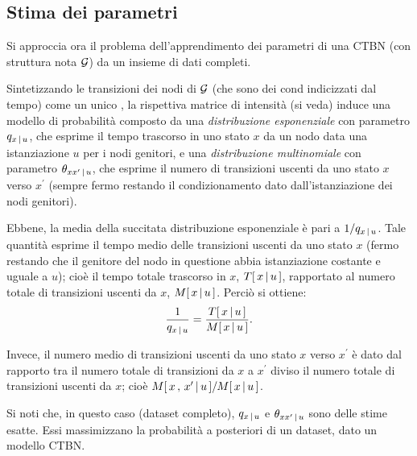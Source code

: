 \subsection{Stima dei parametri}
\label{sec:ctbn-params}
Si approccia ora il problema dell'apprendimento dei parametri di una \acl{CTBN} (con struttura nota $\mathcal{G}$) da un insieme di dati completi.

Sintetizzando le transizioni dei nodi di $\mathcal{G}$ (che sono dei \mprocess{}cond{} indicizzati dal tempo) come un unico \mprocess{} \omog{}, la rispettiva matrice di intensità (si veda) induce una modello di probabilità composto da una \emph{distribuzione esponenziale} con parametro $q_{x\,\arrowvert\,u}$, che esprime il tempo trascorso in uno stato $x$ da un nodo data una istanziazione $u$ per i nodi genitori, e una \emph{distribuzione multinomiale} con parametro $\theta_{xx^\prime\,\arrowvert\,u}$, che esprime il numero di transizioni uscenti da uno stato $x$ verso $x^\prime$ (sempre fermo restando il condizionamento dato dall'istanziazione dei nodi genitori).

Ebbene, la media della succitata distribuzione esponenziale è pari a $1/q_{x\,\arrowvert\,u}$. Tale quantità esprime il tempo medio delle transizioni uscenti da uno stato $x$ (fermo restando che il genitore del nodo in questione abbia istanziazione costante e uguale a $u$); cioè il tempo totale trascorso in $x$, $T[\,x\,\arrowvert\,u\,]$, rapportato al numero totale di transizioni uscenti da $x$, $\mstat{x\,\arrowvert\,u}$. Perciò si ottiene:
\[
\frac{1}{q_{x\,\arrowvert\,u}}=\frac{\tstat{x\,\arrowvert\,u}}{\mstat{x\,\arrowvert\,u}}\text{.}
\]

Invece, il numero medio di transizioni uscenti da uno stato $x$ verso $x^\prime$ è dato dal rapporto tra il numero totale di transizioni da $x$ a $x^\prime$ diviso il numero totale di transizioni uscenti da $x$; cioè $\mstat[x]{x^\prime\,\arrowvert\,u}/\mstat{x\,\arrowvert\,u}$.

Si noti che, in questo caso (dataset completo), $q_{x\,\arrowvert\,u}$ e $\theta_{xx^\prime\,\arrowvert\,u}$ sono delle stime esatte. Essi massimizzano la probabilità a posteriori di un dataset, dato un modello \acs{CTBN}.

